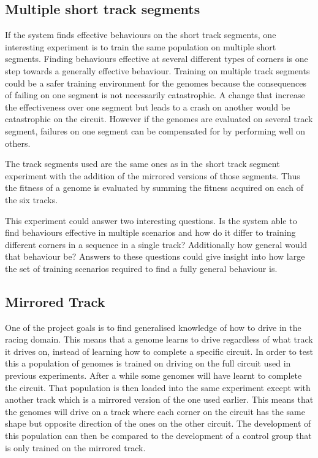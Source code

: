 \subsection{Multiple short track segments}

If the system finds effective behaviours on the short track segments, one interesting experiment is to train the same population on multiple short segments. Finding behaviours effective at several different types of corners is one step towards a generally effective behaviour. Training on multiple track segments could be a safer training environment for the genomes because the consequences of failing on one segment is not necessarily catastrophic. A change that increase the effectiveness over one segment but leads to a crash on another would be catastrophic on the circuit. However if the genomes are evaluated on several track segment, failures on one segment can be compensated for by performing well on others. 

The track segments used are the same ones as in the short track segment experiment with the addition of the mirrored versions of those segments. Thus the fitness of a genome is evaluated by summing the fitness acquired on each of the six tracks.

This experiment could answer two interesting questions. Is the system able to find behaviours effective in multiple scenarios and how do it differ to training different corners in a sequence in a single track? Additionally how general would that behaviour be? Answers to these questions could give insight into how large the set of training scenarios required to find a fully general behaviour is. 


\subsection{Mirrored Track}
\label{method:mirror}
One of the project goals is to find generalised knowledge of how to drive in the racing domain. This means that a genome learns to drive regardless of what track it drives on, instead of learning how to complete a specific circuit. In order to test this a population of genomes is trained on driving on the full circuit used in previous experiments. After a while some genomes will have learnt to complete the circuit. That population is then loaded into the same experiment except with another track which is a mirrored version of the one used earlier. This means that the genomes will drive on a track where each corner on the circuit has the same shape but opposite direction of the ones on the other circuit. The development of this population can then be compared to the development of a control group that is only trained on the mirrored track. 

